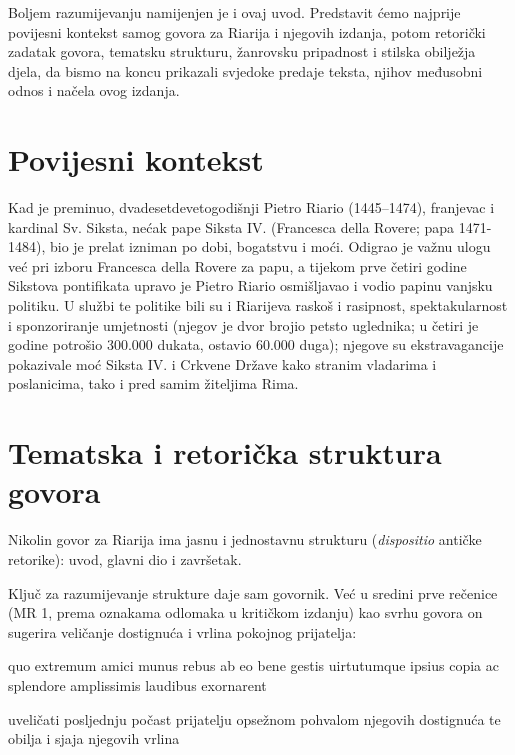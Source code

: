 \documentclass[a5paper,twoside]{article}
\renewenvironment{quote}
               {\list{}{\rightmargin 0mm
                \leftmargin 7mm
                \itemindent 0em}%
                \item\relax}
               {\endlist}
\begin{document}
Boljem razumijevanju namijenjen je i ovaj uvod. Predstavit ćemo najprije povijesni kontekst samog govora za Riarija i njegovih izdanja, potom retorički zadatak govora, tematsku strukturu, žanrovsku pripadnost i stilska obilježja djela, da bismo na koncu prikazali svjedoke predaje teksta, njihov međusobni odnos i načela ovog izdanja. 

\section{Povijesni kontekst}

Kad je preminuo, dvadesetdevetogodišnji Pietro Riario (1445–1474), franjevac i kardinal Sv. Siksta, nećak pape Siksta IV. (Francesca della Rovere; papa 1471-1484), bio je prelat izniman po dobi, bogatstvu i moći. Odigrao je važnu ulogu već pri izboru Francesca della Rovere za papu, a tijekom prve četiri godine Sikstova pontifikata upravo je Pietro Riario osmišljavao i vodio papinu vanjsku politiku. U službi te politike bili su i Riarijeva raskoš i rasipnost, spektakularnost i sponzoriranje umjetnosti (njegov je dvor brojio petsto uglednika; u četiri je godine potrošio 300.000 dukata, ostavio 60.000 duga); njegove su ekstravagancije pokazivale moć Siksta IV. i Crkvene Države kako stranim vladarima i poslanicima, tako i pred samim žiteljima Rima.

\section{Tematska i retorička struktura govora}

Nikolin govor za Riarija ima jasnu i jednostavnu strukturu (\textit{\textlatin{dispositio}} antičke retorike): uvod, glavni dio i završetak. 

Ključ za razumijevanje strukture daje sam govornik. Već u sredini prve rečenice (MR 1, prema oznakama odlomaka u kritičkom izdanju) kao svrhu govora on sugerira veličanje dostignuća i vrlina pokojnog prijatelja:

\begin{quote}
\begin{latin}
quo extremum amici munus rebus ab eo bene gestis uirtutumque ipsius copia ac splendore amplissimis laudibus exornarent
\end{latin}

uveličati posljednju počast prijatelju opsežnom pohvalom njegovih dostignuća te obilja i sjaja njegovih vrlina
\end{quote}
\end{document}
